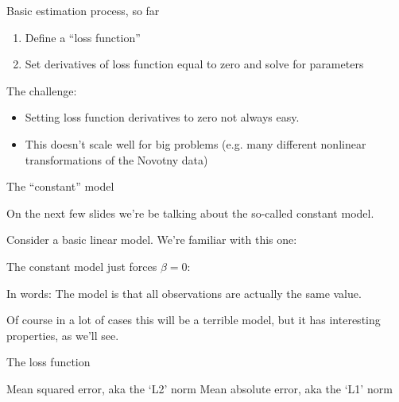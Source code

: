 \documentclass[aspectratio=169]{beamer}
\begin{document}
\begin{frame}{Basic estimation process, so far}
\begin{enumerate}
\item Define a ``loss function''
\item Set derivatives of loss function equal to zero and solve for parameters
\end{enumerate}

\vspace{5mm}
The challenge:
\begin{itemize}
\item Setting loss function derivatives to zero not always easy.
\item This doesn't scale well for big problems (e.g. many different nonlinear transformations of the Novotny data)
\end{itemize}
\end{frame}

\begin{frame}{The ``constant'' model}

On the next few slides we're be talking about the so-called constant model.

\vspace{5mm}

Consider a basic linear model.  We're familiar with this one:

The constant model just forces $\beta = 0$:

In words: The model is that all observations are actually the same value.  

\vspace{5mm}

Of course in a lot of cases this will be a terrible model, but it has interesting properties, as we'll see.


\end{frame}

\begin{frame}{The loss function}

Mean squared error, aka the `L2' norm
Mean absolute error, aka the `L1' norm

\end{frame}
\end{document}
